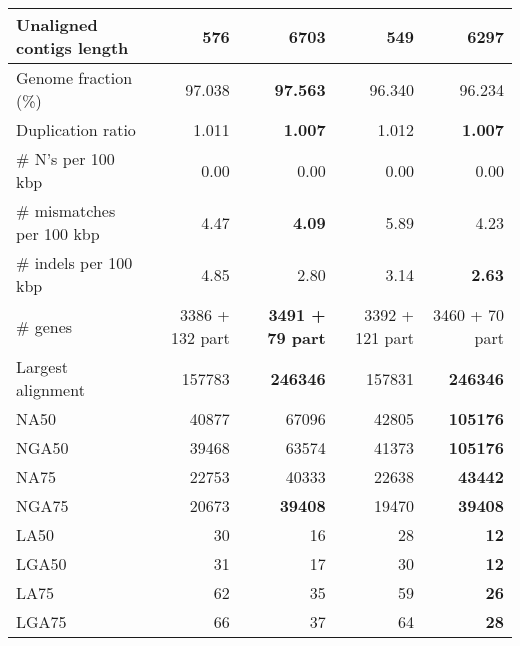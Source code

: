 \documentclass[12pt,a4paper]{article}
\begin{document}
\begin{table}[ht]
\begin{center}
\begin{tabular}{|l*{4}{|r}|}
Unaligned contigs length & 576 & 6703 & {\bf 549} & 6297 \\ \hline
Genome fraction (\%) & 97.038 & {\bf 97.563} & 96.340 & 96.234 \\ \hline
Duplication ratio & 1.011 & {\bf 1.007} & 1.012 & {\bf 1.007} \\ \hline
\# N's per 100 kbp & 0.00 & 0.00 & 0.00 & 0.00 \\ \hline
\# mismatches per 100 kbp & 4.47 & {\bf 4.09} & 5.89 & 4.23 \\ \hline
\# indels per 100 kbp & 4.85 & 2.80 & 3.14 & {\bf 2.63} \\ \hline
\# genes & 3386 + 132 part & {\bf 3491 + 79 part} & 3392 + 121 part & 3460 + 70 part \\ \hline
Largest alignment & 157783 & {\bf 246346} & 157831 & {\bf 246346} \\ \hline
NA50 & 40877 & 67096 & 42805 & {\bf 105176} \\ \hline
NGA50 & 39468 & 63574 & 41373 & {\bf 105176} \\ \hline
NA75 & 22753 & 40333 & 22638 & {\bf 43442} \\ \hline
NGA75 & 20673 & {\bf 39408} & 19470 & {\bf 39408} \\ \hline
LA50 & 30 & 16 & 28 & {\bf 12} \\ \hline
LGA50 & 31 & 17 & 30 & {\bf 12} \\ \hline
LA75 & 62 & 35 & 59 & {\bf 26} \\ \hline
LGA75 & 66 & 37 & 64 & {\bf 28} \\ \hline
\end{tabular}
\end{center}
\end{table}
\end{document}
